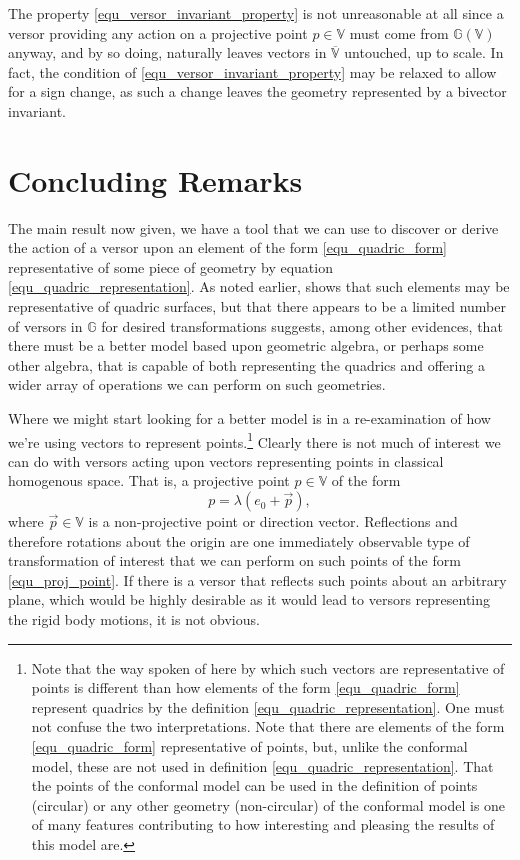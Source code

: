 \documentclass{birkjour}
\theoremstyle{definition}
\theoremstyle{remark}
\numberwithin{equation}{section}
\newcommand{\G}{\mathbb{G}}
\newcommand{\V}{\mathbb{V}}
\begin{document}
The property \eqref{equ_versor_invariant_property} is not unreasonable at all
since a versor providing any action on a projective point $p\in\V$ must come from $\G(\V)$ anyway,
and by so doing, naturally leaves vectors in $\overline{\V}$ untouched, up to scale.
In fact, the condition of \eqref{equ_versor_invariant_property} may be relaxed to allow
for a sign change, as such a change leaves the geometry represented by a bivector invariant.

\section{Concluding Remarks}

The main result now given, we have a tool that we can use to discover or derive the
action of a versor upon an element of the form \eqref{equ_quadric_form} representative of some piece of geometry
by equation \eqref{equ_quadric_representation}.  As noted earlier, \cite{Parkin12} shows that such elements may
be representative of quadric surfaces, but that there appears to be a limited number of
versors in $\G$ for desired transformations suggests, among other evidences, that there must
be a better model based upon geometric algebra, or perhaps some other algebra, that is capable of both representing the
quadrics and offering a wider array of operations we  can perform on such geometries.

Where we might start looking for a better model is in a re-examination of how we're using
vectors to represent points.\footnote{Note that the way spoken of here by which such vectors are
representative of points is different than how elements of the form \eqref{equ_quadric_form}
represent quadrics by the definition \eqref{equ_quadric_representation}.  One must not
confuse the two interpretations.  Note that there are elements of the form \eqref{equ_quadric_form}
representative of points, but, unlike the conformal model, these are not used in definition
\eqref{equ_quadric_representation}.  That the points of the conformal model can be used
in the definition of points (circular) or any other geometry (non-circular) of the conformal model is one of many
features contributing to how interesting and pleasing the results of this model are.}
Clearly there is not much of interest we can do with versors acting
upon vectors representing points in classical homogenous space.  That is, a projective point $p\in\V$
of the form
\begin{equation}\label{equ_proj_point}
p = \lambda(e_0 + \vec{p}),
\end{equation}
where $\vec{p}\in\V$ is a non-projective point or direction vector.  Reflections and therefore rotations
about the origin are one immediately observable type of transformation of interest
that we can perform on such points of the form \eqref{equ_proj_point}.
If there is a versor that reflects such points about
an arbitrary plane, which would be highly desirable as it would lead to versors
representing the rigid body motions, it is not obvious.
\end{document}
